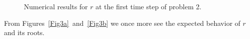 \documentclass{article}
\begin{document}
    \begin{figure}[H]
        \centering
        \hfill
        \hfill
        \caption{Numerical results for \(r\) at the first time step of problem 2.} \label{Fig3}
    \end{figure}

    From Figures~\ref{Fig3a}~and~\ref{Fig3b} we once more see the expected behavior of \(r\) and its roots.
\end{document}

